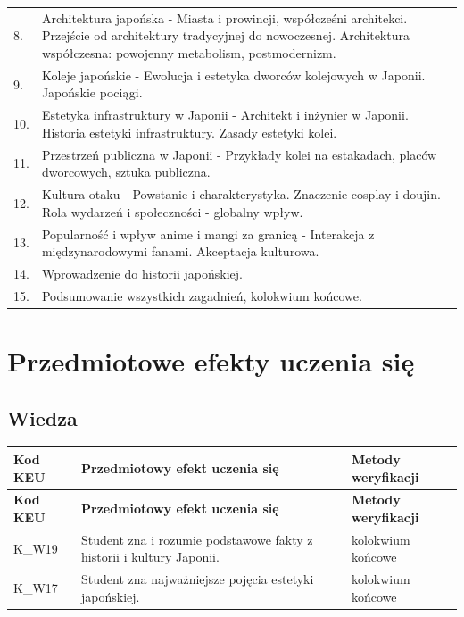 \documentclass[12pt, a4paper]{article}
\newcommand{\thdrule}{\noalign{\global\setlength{\extrarowheight}{0pt}}}
\newcommand{\thdend}{\noalign{\global\setlength{\extrarowheight}{3pt}}}
\begin{document}
{\begin{longtable}{m{1.5cm}m{14.5cm}}
  \rowcolor{tableRowAlt} 8. & Architektura japońska - Miasta i prowincji, współcześni architekci. Przejście od architektury tradycyjnej do nowoczesnej. Architektura współczesna: powojenny metabolism, postmodernizm. \\
  \rowcolor{tableRowLight} 9. & Koleje japońskie - Ewolucja i estetyka dworców kolejowych w Japonii. Japońskie pociągi. \\
  \rowcolor{tableRowAlt} 10. & Estetyka infrastruktury w Japonii - Architekt i inżynier w Japonii. Historia estetyki infrastruktury. Zasady estetyki kolei. \\
  \rowcolor{tableRowLight} 11. & Przestrzeń publiczna w Japonii - Przykłady kolei na estakadach, placów dworcowych, sztuka publiczna. \\
  \rowcolor{tableRowAlt} 12. & Kultura otaku - Powstanie i charakterystyka. Znaczenie cosplay i doujin. Rola wydarzeń i społeczności - globalny wpływ. \\
  \rowcolor{tableRowLight} 13. & Popularność i wpływ anime i mangi za granicą - Interakcja z międzynarodowymi fanami. Akceptacja kulturowa. \\
  \rowcolor{tableRowAlt} 14. & Wprowadzenie do historii japońskiej. \\
  \rowcolor{tableRowLight} 15. & Podsumowanie wszystkich zagadnień, kolokwium końcowe. \\
\bottomrule
\end{longtable}}

\section{Przedmiotowe efekty uczenia się}

\subsection*{Wiedza}
{\scriptsize
\begin{longtable}{m{1.6cm}m{9.0cm}m{4.2cm}}
\thdrule\toprule
\rowcolor{pjatkRed} {\color{white}\footnotesize\textbf{\vphantom{Ag}Kod KEU}} & {\color{white}\footnotesize\textbf{\vphantom{Ag}Przedmiotowy efekt uczenia się}} & {\color{white}\footnotesize\textbf{\vphantom{Ag}Metody weryfikacji}} \\
\midrule\thdend
\endfirsthead
\thdrule\toprule
\rowcolor{pjatkRed} {\color{white}\footnotesize\textbf{\vphantom{Ag}Kod KEU}} & {\color{white}\footnotesize\textbf{\vphantom{Ag}Przedmiotowy efekt uczenia się}} & {\color{white}\footnotesize\textbf{\vphantom{Ag}Metody weryfikacji}} \\
\midrule\thdend
\endhead
  \rowcolor{tableRowLight} K\_W19 & Student zna i rozumie podstawowe fakty z historii i kultury Japonii. & kolokwium końcowe \\
  \rowcolor{tableRowAlt} K\_W17 & Student zna najważniejsze pojęcia estetyki japońskiej. & kolokwium końcowe \\
\bottomrule
\end{longtable}}
\end{document}
